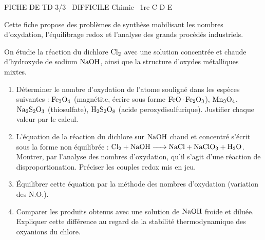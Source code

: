 \documentclass[11pt]{article}
\begin{document}
\begin{tcolorbox}[enhanced,colback=popink,colframe=popink,arc=10pt,boxrule=0pt,left=12pt,right=12pt,top=9pt,bottom=9pt]
{\color{white}\popxbold\small FICHE DE TD 3/3 \textbullet\ DIFFICILE \hfill Chimie \textbullet\ 1re C D E\par}
\end{tcolorbox}
\vspace{4pt}
Cette fiche propose des problèmes de synthèse mobilisant les nombres d'oxydation, l'équilibrage redox et l'analyse des grands procédés industriels.

\begin{exercice}
On étudie la réaction du dichlore $\ce{Cl2}$ avec une solution concentrée et chaude d'hydroxyde de sodium $\ce{NaOH}$, ainsi que la structure d'oxydes métalliques mixtes.
\begin{enumerate}
    \item Déterminer le nombre d'oxydation de l'atome souligné dans les espèces suivantes : $\ce{Fe3O4}$ (magnétite, écrire sous forme $\ce{FeO.Fe2O3}$), $\ce{Mn3O4}$, $\ce{Na2S2O3}$ (thiosulfate), $\ce{H2S2O8}$ (acide peroxydisulfurique). Justifier chaque valeur par le calcul.
    \item L'équation de la réaction du dichlore sur $\ce{NaOH}$ chaud et concentré s'écrit sous la forme non équilibrée :
    $\ce{Cl2 + NaOH -> NaCl + NaClO3 + H2O}$.
    Montrer, par l'analyse des nombres d'oxydation, qu'il s'agit d'une réaction de disproportionation. Préciser les couples redox mis en jeu.
    \item Équilibrer cette équation par la méthode des nombres d'oxydation (variation des N.O.).
    \item Comparer les produits obtenus avec une solution de $\ce{NaOH}$ froide et diluée. Expliquer cette différence au regard de la stabilité thermodynamique des oxyanions du chlore.
\end{enumerate}
\end{exercice}
\end{document}
